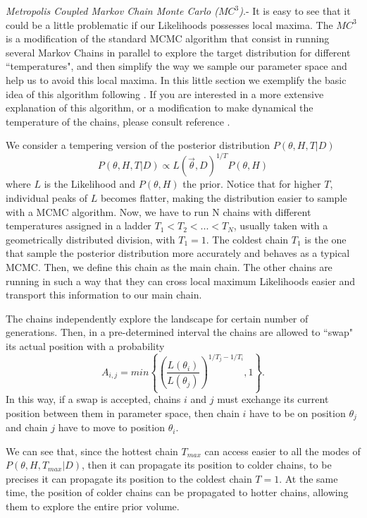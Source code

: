 \documentclass[onecolumn,           %
               showpacs,            %
               preprintnumbers,     %
               aps,                 %
               prl,          	    %
               letterpaper,             %
               superscriptaddress,      %
               nofootinbib,         %
               tightenlines,        %
               floats,floatfix      %
               ,usenatbib,
               ]{revtex4-1}
\begin{document}
\textit{Metropolis Coupled Markov Chain Monte Carlo ($MC^3$)}.- It is easy to see that it could be a little problematic if our Likelihoods possesses local maxima. The $MC^3$ is a modification of the standard MCMC algorithm that consist in running several Markov Chains in parallel to explore the target distribution for different  ``temperatures", and then simplify the way we sample our parameter space and help us to avoid this local maxima. In this little section we exemplify the basic idea of this algorithm following \cite{mcmcmc}. If you are interested in a more extensive explanation of this algorithm, or a modification to make dynamical the temperature of the chains, please consult reference \cite{mcmcmc}.

We consider a tempering version of the posterior distribution $P(\theta,H,T|D)$
\begin{equation}
P(\theta,H,T|D) \propto L(\vec\theta,D)^{1/T}P(\theta,H)
\end{equation}
where $L$ is the Likelihood and $P(\theta,H)$ the prior. Notice that for higher $T$, individual peaks of $L$ becomes flatter, making the distribution easier to sample with a MCMC algorithm. Now, we have to run N chains with different temperatures assigned in a ladder $T_1<T_2<...<T_N$, usually taken with a geometrically distributed division, with $T_1=1$. The coldest chain $T_1$ is the one that sample the posterior distribution more accurately and behaves as a typical MCMC. Then, we define this chain as the main chain. The other chains are running in such a way that they can cross local maximum Likelihoods easier and transport this information to our main chain.  

The chains independently explore the landscape for certain number of generations. Then, in a pre-determined interval the chains are allowed to ``swap" its actual position with a probability
\begin{equation}
A_{i,j}=min\left\lbrace\left(\frac{L(\theta_i)}{L(\theta_j)}\right)^{1/T_j-1/T_i},1\right\rbrace .
\end{equation}
In this way, if a swap is accepted, chains $i$ and $j$ must exchange its current position between them in parameter space, then chain $i$ have to be on position $\theta_j$ and chain $j$ have to move to position $\theta_i$. 

We can see that, since the hottest chain $T_{max}$ can access easier to all the modes of $P(\theta,H,T_{max}|D)$, then it can propagate its position to colder chains, to be precises it can propagate its position to the coldest chain $T=1$. At the same time, the position of colder chains can be propagated to hotter chains, allowing them to explore the entire prior volume.   
\\
\end{document}
